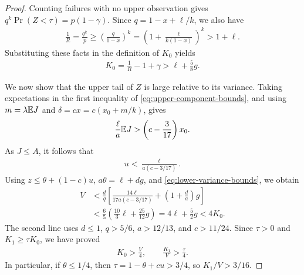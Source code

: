 \begin{proof}
Counting failures with no upper observation gives
$q^k\Pr(Z<\tau)=p(1-\gamma)$.
Since $q=1-x+\ell/k$, we also have
\begin{align*}
 \frac1R=\frac{q^k}{p}
 \ge\left(\frac q{1-x}\right)^k
 =\left(1+\frac{\ell}{k(1-x)}\right)^k>1+\ell.
\end{align*}
Substituting these facts in the definition of $K_0$ yields
\begin{align}
 K_0=\frac1R-1+\gamma>\ell+\frac58g.
 \label{eq:lower-tail-mass}
\end{align}

We now show that the upper tail of $Z$ is large relative to its variance.
Taking expectations in the first inequality of \cref{eq:upper-component-bounds}, and using $m=\lambda\mathbb E J$ and $\delta=cx=c(x_0+m/k)$, gives
\begin{align*}
 \frac{\ell}{a}\mathbb E J>\left(c-\frac3{17}\right)x_0.
\end{align*}
As $J\le A$, it follows that
\begin{align*}
 u<\frac{\ell}{a(c-3/17)}.
\end{align*}
Using $z\le\theta+(1-c)u$, $a\theta=\ell+dg$, and \cref{eq:lower-variance-bounds}, we obtain
\begin{align*}
 V
 &<\frac dq\left[\frac{14\ell}{17a(c-3/17)}+\left(1+\frac da\right)g\right]\\
 &<\frac65\left(\frac{10}{3}\ell+\frac{25}{12}g\right)
 =4\ell+\frac52g
 <4K_0.
\end{align*}
The second line uses $d\le1$, $q>5/6$, $a>12/13$, and $c>11/24$.
Since $\tau>0$ and $K_1\ge\tau K_0$, we have proved
\begin{align}
 K_0>\frac V4,
 \qquad \frac{K_1}{V}>\frac\tau4.
 \label{eq:lower-tail-first-moment-basic}
\end{align}
In particular, if $\theta\le1/4$, then $\tau=1-\theta+cu>3/4$, so $K_1/V>3/16$.


\end{proof}
